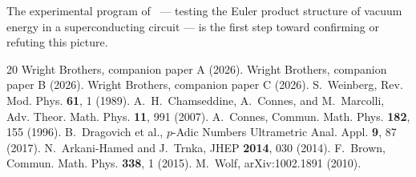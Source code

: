 \documentclass[11pt,a4paper]{article}
\begin{document}
The experimental program of~\cite{paper_A} --- testing the
Euler product structure of vacuum energy in a superconducting
circuit --- is the first step toward confirming or refuting
this picture.

\begin{thebibliography}{20}
 Wright Brothers, companion paper A (2026).
 Wright Brothers, companion paper B (2026).
 Wright Brothers, companion paper C (2026).
 S.~Weinberg, Rev. Mod. Phys. \textbf{61}, 1 (1989).
 A.~H.~Chamseddine, A.~Connes, and M.~Marcolli, Adv. Theor. Math. Phys. \textbf{11}, 991 (2007).
 A.~Connes, Commun. Math. Phys. \textbf{182}, 155 (1996).
 B.~Dragovich et al., $p$-Adic Numbers Ultrametric Anal. Appl. \textbf{9}, 87 (2017).
 N.~Arkani-Hamed and J.~Trnka, JHEP \textbf{2014}, 030 (2014).
 F.~Brown, Commun. Math. Phys. \textbf{338}, 1 (2015).
 M.~Wolf, arXiv:1002.1891 (2010).
\end{thebibliography}
\end{document}
